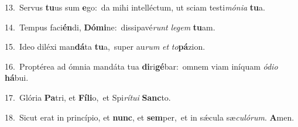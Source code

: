 {\numbfont\textcolor{\numbcolor}{13.}}~Servus \textbf{tu}\-us sum \textbf{e}\-go:~\star da mihi intelléctum, ut sciam testi\-\textit{mó}\-\textit{ni}\textit{a} \textbf{tu}\-a.\par
{\numbfont\textcolor{\numbcolor}{14.}}~Tempus faci\-\textbf{én}\-di, \textbf{Dó}\-\textbf{mi}ne:~\star dissipavé\textit{runt} \textit{le}\-\textit{gem} \textbf{tu}\-am.\par
{\numbfont\textcolor{\numbcolor}{15.}}~Ideo diléxi man\-\textbf{dá}\-ta \textbf{tu}\-a,~\star super au\textit{rum} \textit{et} \textit{to}\-\textbf{pá}zion.\par
{\numbfont\textcolor{\numbcolor}{16.}}~Proptérea ad ómnia mandáta tua \textbf{di}\-ri\-\textbf{gé}\-bar:~\star omnem viam iníquam \textit{ó}\-\textit{di}\textit{o} \textbf{há}\-bui.\par
{\numbfont\textcolor{\numbcolor}{17.}}~Glória \textbf{Pa}\-tri, et \textbf{Fí}\-\textbf{li}o,~\star et Spi\-\textit{rí}\-\textit{tu}\textit{i} \textbf{Sanc}\-to.\par
{\numbfont\textcolor{\numbcolor}{18.}}~Sicut erat in princípio, et \textbf{nunc}\-, et \textbf{sem}\-per,~\star et in sǽcula sæ\-\textit{cu}\-\textit{ló}\textit{rum}. \textbf{A}\-men.\par
